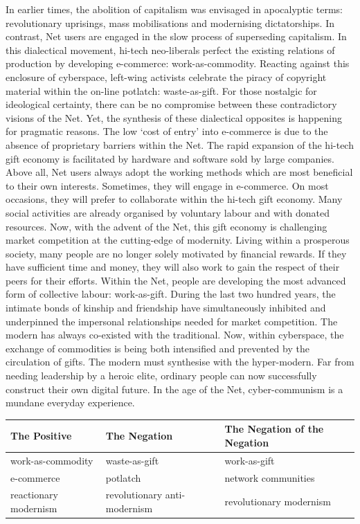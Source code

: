 \documentclass[letterpaper,12pt,english]{sphinxmanual}
\begin{document}
In earlier times, the abolition of capitalism was envisaged in
apocalyptic terms: revolutionary uprisings, mass mobilisations and
modernising dictatorships. In contrast, Net users are engaged in the
slow process of superseding capitalism. In this dialectical movement,
hi-tech neo-liberals perfect the existing relations of production by
developing e-commerce: work-as-commodity. Reacting against this
enclosure of cyberspace, left-wing activists celebrate the piracy of
copyright material within the on-line potlatch: waste-as-gift. For those
nostalgic for ideological certainty, there can be no compromise between
these contradictory visions of the Net. Yet, the synthesis of these
dialectical opposites is happening for pragmatic reasons. The low `cost
of entry' into e-commerce is due to the absence of proprietary barriers
within the Net. The rapid expansion of the hi-tech gift economy is
facilitated by hardware and software sold by large companies. Above all,
Net users always adopt the working methods which are most beneficial to
their own interests. Sometimes, they will engage in e-commerce. On most
occasions, they will prefer to collaborate within the hi-tech gift
economy. Many social activities are already organised by voluntary
labour and with donated resources. Now, with the advent of the Net, this
gift economy is challenging market competition at the cutting-edge of
modernity. Living within a prosperous society, many people are no longer
solely motivated by financial rewards. If they have sufficient time and
money, they will also work to gain the respect of their peers for their
efforts. Within the Net, people are developing the most advanced form of
collective labour: work-as-gift. During the last two hundred years, the
intimate bonds of kinship and friendship have simultaneously inhibited
and underpinned the impersonal relationships needed for market
competition. The modern has always co-existed with the traditional. Now,
within cyberspace, the exchange of commodities is being both intensified
and prevented by the circulation of gifts. The modern must synthesise
with the hyper-modern. Far from needing leadership by a heroic elite,
ordinary people can now successfully construct their own digital future.
In the age of the Net, cyber-communism is a mundane everyday experience.

\begin{tabulary}{\linewidth}{|L|L|L|}
\hline
\textsf{\relax 
The Positive
} & \textsf{\relax 
The Negation
} & \textsf{\relax 
The Negation of the Negation
}\\
\hline
work-as-commodity
 & 
waste-as-gift
 & 
work-as-gift
\\
\hline
e-commerce
 & 
potlatch
 & 
network communities
\\
\hline
reactionary modernism
 & 
revolutionary anti-modernism
 & 
revolutionary modernism
\\
\hline\end{tabulary}
\end{document}
